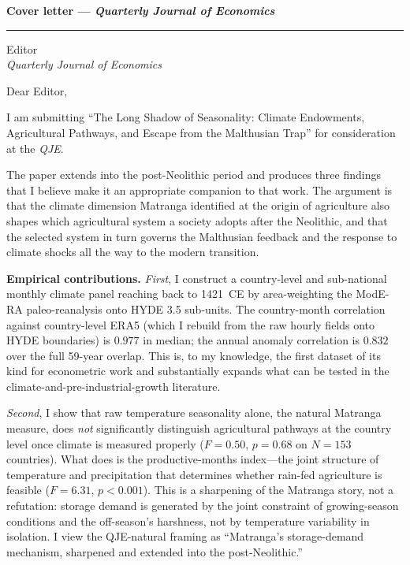 \documentclass[11pt,letterpaper]{article}
\begin{document}
\noindent\textbf{Cover letter --- \emph{Quarterly Journal of Economics}}\\[0.4em]
\textcolor{mutedgray}{\rule{0.22\linewidth}{0.4pt}}

\bigskip
\noindent Editor\\
\textit{Quarterly Journal of Economics}

\bigskip

\noindent Dear Editor,

\bigskip

\noindent I am submitting ``The Long Shadow of Seasonality: Climate Endowments, Agricultural Pathways, and Escape from the Malthusian Trap'' for consideration at the \emph{QJE}.

The paper extends \citet{matranga2024} into the post-Neolithic period and produces three findings that I believe make it an appropriate companion to that work. The argument is that the climate dimension Matranga identified at the origin of agriculture also shapes which agricultural system a society adopts after the Neolithic, and that the selected system in turn governs the Malthusian feedback and the response to climate shocks all the way to the modern transition.

\textbf{Empirical contributions.} \emph{First}, I construct a country-level and sub-national monthly climate panel reaching back to 1421~CE by area-weighting the ModE-RA paleo-reanalysis onto HYDE 3.5 sub-units. The country-month correlation against country-level ERA5 (which I rebuild from the raw hourly fields onto HYDE boundaries) is $0.977$ in median; the annual anomaly correlation is $0.832$ over the full 59-year overlap. This is, to my knowledge, the first dataset of its kind for econometric work and substantially expands what can be tested in the climate-and-pre-industrial-growth literature.

\emph{Second}, I show that raw temperature seasonality alone, the natural Matranga measure, does \emph{not} significantly distinguish agricultural pathways at the country level once climate is measured properly ($F=0.50$, $p=0.68$ on $N=153$ countries). What does is the productive-months index---the joint structure of temperature and precipitation that determines whether rain-fed agriculture is feasible ($F=6.31$, $p<0.001$). This is a sharpening of the Matranga story, not a refutation: storage demand is generated by the joint constraint of growing-season conditions and the off-season's harshness, not by temperature variability in isolation. I view the QJE-natural framing as ``Matranga's storage-demand mechanism, sharpened and extended into the post-Neolithic.''
\end{document}
